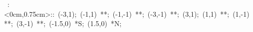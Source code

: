 
%
%


\hbox{
\xy    <2cm,0cm>:<0cm,0.75cm>::
       (-3,1); (-1,1) **\dir{-}; (-1,-1) **\dir{-}; (-3,-1) **\dir{-}; 
       (3,1); (1,1) **\dir{-}; (1,-1) **\dir{-}; (3,-1) **\dir{-};
       (-1.5,0) *{\bigrm S}; (1.5,0) *{\bigrm N};  
\endxy}

